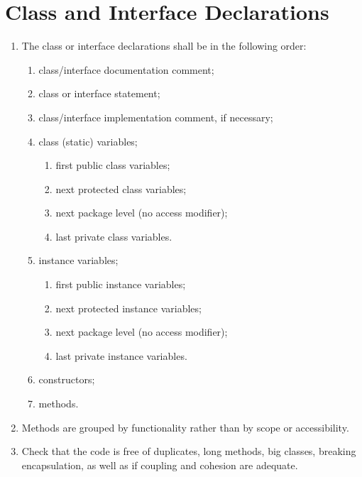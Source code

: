 \section{Class and Interface Declarations}\begin{enumerate}[resume]
\item \label{item:X}The class or interface declarations shall be in the following order:
	\begin{enumerate}
		\item \label{item:X}class/interface documentation comment;
		\item \label{item:X}class or interface statement;
		\item \label{item:X}class/interface implementation comment, if necessary;
		\item \label{item:X}class (static) variables;
		\begin{enumerate}
			\item \label{item:25di}first public class variables;
			\item \label{item:X}next protected class variables;
			\item \label{item:X}next package level (no access modifier);
			\item \label{item:X}last private class variables.
		\end{enumerate}
		\item \label{item:X}instance variables;
		\begin{enumerate}
			\item \label{item:X}first public instance variables;
			\item \label{item:X}next protected instance variables;
			\item \label{item:X}next package level (no access modifier);
			\item \label{item:X}last private instance variables.
		\end{enumerate}
		\item \label{item:X}constructors;
		\item \label{item:X}methods.
	\end{enumerate}
	\item \label{item:X}Methods are grouped by functionality rather than by scope or accessibility.
	\item \label{item:X}Check that the code is free of duplicates, long methods, big classes, breaking encapsulation, as well as if coupling and cohesion are adequate.
\end{enumerate}

